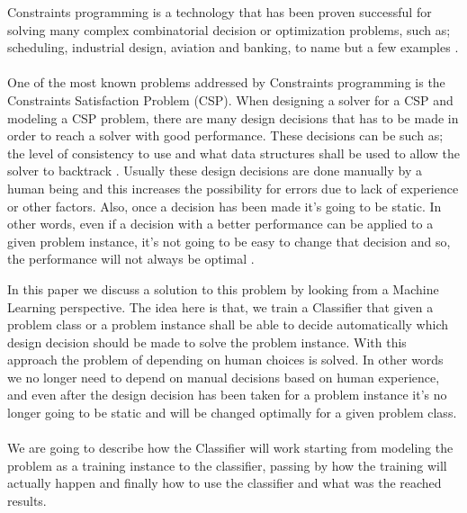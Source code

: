 Constraints programming is a technology that has been proven successful for solving many complex combinatorial decision or optimization problems, such as; scheduling, industrial design, aviation and banking, to name but a few examples \cite{ml:csd}.
\\
\\
One of the most known problems addressed by Constraints programming is the Constraints Satisfaction Problem (CSP). When designing a solver for a CSP and modeling a CSP problem, there are many design decisions that has to be made in order to reach a solver with good performance. These decisions can be such as; the level of consistency to use and what data structures shall be used to allow the solver to backtrack \cite{ml:csd}. Usually these design decisions are done manually by a human being and this increases the possibility for errors due to lack of experience or other factors. Also, once a decision has been made it's going to be static. In other words, even if a decision with a better performance can be applied to a given problem instance, it's not going to be easy to change that decision and so, the performance will not always be optimal \cite{ml:csd}.

In this paper we discuss a solution to this problem by looking from a Machine Learning perspective. The idea here is that, we train a Classifier that given a problem class or a problem instance shall be able to decide automatically which design decision should be made to solve the problem instance. With this approach the problem of depending on human choices is solved. In other words we no longer need to depend on manual decisions based on human experience, and even after the design decision has been taken for a problem instance it's no longer going to be static and will be changed optimally for a given problem class.
\\
\\
We are going to describe how the Classifier will work starting from modeling the problem as a training instance to the classifier, passing by how the training will actually happen and finally how to use the classifier and what was the reached results.
